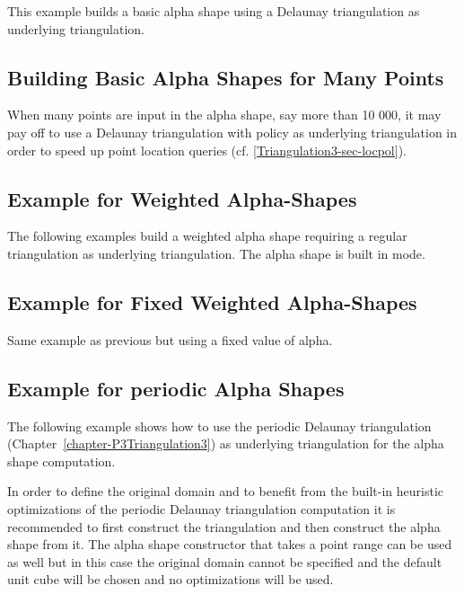 This example builds a basic alpha shape using a  Delaunay triangulation
as underlying triangulation.




\subsection{Building Basic Alpha Shapes for Many Points}
When many points are input in the alpha shape, say more than 10 000,
it may pay off to use a Delaunay triangulation with 
policy as underlying triangulation in order to speed up point location
queries (cf. \ref{Triangulation3-sec-locpol}).


\subsection{Example for Weighted Alpha-Shapes\label{I1_SectWeightedAS3D}}

The following examples build a weighted alpha shape requiring a
regular triangulation as underlying triangulation.
The alpha shape is built in  mode.



\subsection{Example for Fixed Weighted Alpha-Shapes\label{I1_SectFxWeightedAS3D}}

Same example as previous but using a fixed value of alpha.


\subsection{Example for periodic
  Alpha Shapes\label{l1_SectPeriodicAS3D}}

The following example shows how to use the periodic Delaunay
triangulation (Chapter~\ref{chapter-P3Triangulation3}) as underlying
triangulation for the alpha shape computation.

In order to define the original domain and to benefit from the
built-in heuristic optimizations of the periodic Delaunay
triangulation computation it is recommended to first construct the
triangulation and then construct the alpha shape from it. The alpha
shape constructor that takes a point range can be used as well but in
this case the original domain cannot be specified and the default unit
cube will be chosen and no optimizations will be used.

